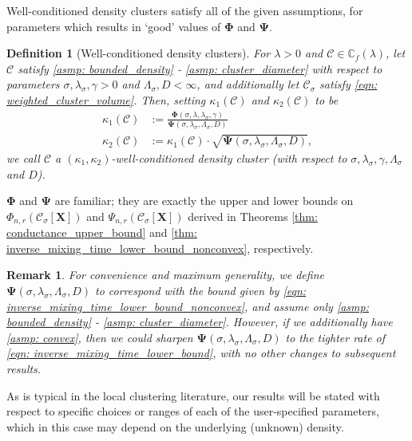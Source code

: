 \documentclass{article}
\newcommand{\1}{\mathbf{1}}
\newcommand{\Phibf}{\mathbf{\Phi}}
\newcommand{\Psibf}{\mathbf{\Psi}}
\newcommand{\Xbf}{\mathbf{X}}
\newcommand{\Cbb}{\mathbb{C}}
\newcommand{\Cset}{\mathcal{C}}
\newcommand{\Csig}{\Cset_{\sigma}}
\theoremstyle{aldenthm}
\newtheorem{definition}{Definition}
\theoremstyle{aldenrmrk}
\newtheorem{remark}{Remark}
\begin{document}
Well-conditioned density clusters satisfy all of the given assumptions, for parameters which results in `good' values of $\Phibf$ and $\Psibf$.
\begin{definition}[Well-conditioned density clusters]
	For $\lambda > 0$ and $\Cset \in \Cbb_f(\lambda)$, let $\Cset$ satisfy \ref{asmp: bounded_density} - \ref{asmp: cluster_diameter} with respect to parameters $\sigma, \lambda_{\sigma}, \gamma > 0$ and $\Lambda_{\sigma}, D < \infty$, and additionally let $\Csig$ satisfy \eqref{eqn: weighted_cluster_volume}. Then, setting $\kappa_1(\Cset)$ and $\kappa_2(\Cset)$ to be
	\begin{align*}
	\kappa_1(\Cset) & := \frac{\mathbf{\Phi}(\sigma, \lambda,\lambda_{\sigma},\gamma)}{\mathbf{\Psi}(\sigma, \lambda_{\sigma}, \Lambda_{\sigma}, D)} \\
	\kappa_2(\Cset) & := \kappa_1(\Cset) \cdot \sqrt{\mathbf{\Psi}(\sigma, \lambda_{\sigma}, \Lambda_{\sigma}, D)},
	\end{align*}
	we call $\Cset$ a \textrm{$(\kappa_1, \kappa_2)$-well-conditioned density cluster (with respect to $\sigma, \lambda_{\sigma}, \gamma, \Lambda_{\sigma}$ and $D$).}
\end{definition}

$\Phibf$ and $\Psibf$ are familiar; they are exactly the upper and lower bounds on $\Phi_{n,r}(\Csig[\Xbf])$ and $\Psi_{n,r}(\Csig[\Xbf])$ derived in Theorems \ref{thm: conductance_upper_bound} and \ref{thm: inverse_mixing_time_lower_bound_nonconvex}, respectively.

\begin{remark}
	For convenience and maximum generality, we define $\mathbf{\Psi}(\sigma, \lambda_{\sigma}, \Lambda_{\sigma}, D)$ to correspond with the bound given by \eqref{eqn: inverse_mixing_time_lower_bound_nonconvex}, and assume only \ref{asmp: bounded_density} - \ref{asmp: cluster_diameter}. However, if we additionally have \ref{asmp: convex}, then we could sharpen $\mathbf{\Psi}(\sigma, \lambda_{\sigma}, \Lambda_{\sigma}, D)$ to the tighter rate of \eqref{eqn: inverse_mixing_time_lower_bound}, with no other changes to subsequent results. 
\end{remark}

As is typical in the local clustering literature, our results will be stated with respect to specific choices or ranges of each of the user-specified parameters, which in this case may depend on the underlying (unknown) density. 
\end{document}
